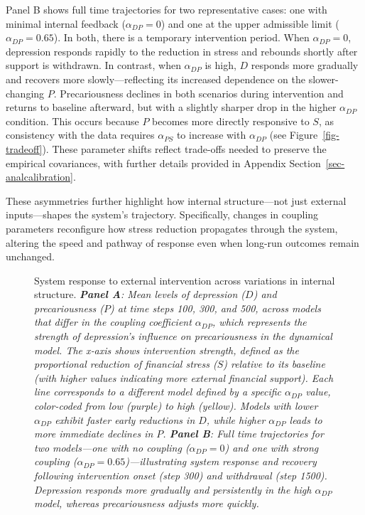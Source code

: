 \documentclass[
]{article}
\begin{document}
Panel B shows full time trajectories for two representative cases: one
with minimal internal feedback (\(\alpha_{DP} = 0\)) and one at the
upper admissible limit (\(\alpha_{DP} = 0.65\)). In both, there is a
temporary intervention period. When \(\alpha_{DP} = 0\), depression
responds rapidly to the reduction in stress and rebounds shortly after
support is withdrawn. In contrast, when \(\alpha_{DP}\) is high, \(D\)
responds more gradually and recovers more slowly---reflecting its
increased dependence on the slower-changing \(P\). Precariousness
declines in both scenarios during intervention and returns to baseline
afterward, but with a slightly sharper drop in the higher
\(\alpha_{DP}\) condition. This occurs because \(P\) becomes more
directly responsive to \(S\), as consistency with the data requires
\(\alpha_{PS}\) to increase with \(\alpha_{DP}\) (see
Figure~\ref{fig-tradeoff}). These parameter shifts reflect trade-offs
needed to preserve the empirical covariances, with further details
provided in Appendix Section~\ref{sec-analcalibration}.

These asymmetries further highlight how internal structure---not just
external inputs---shapes the system's trajectory. Specifically, changes
in coupling parameters reconfigure how stress reduction propagates
through the system, altering the speed and pathway of response even when
long-run outcomes remain unchanged.


\begin{figure}


\caption{\label{fig-intervention}System response to external
intervention across variations in internal structure.
\emph{\textbf{Panel A}: Mean levels of depression (\(D\)) and
precariousness (\(P\)) at time steps 100, 300, and 500, across models
that differ in the coupling coefficient \(\alpha_{DP}\), which
represents the strength of depression's influence on precariousness in
the dynamical model. The x‑axis shows intervention strength, defined as
the proportional reduction of financial stress (\(S\)) relative to its
baseline (with higher values indicating more external financial
support). Each line corresponds to a different model defined by a
specific \(\alpha_{DP}\) value, color-coded from low (purple) to high
(yellow). Models with lower \(\alpha_{DP}\) exhibit faster early
reductions in \(D\), while higher \(\alpha_{DP}\) leads to more
immediate declines in \(P\). \textbf{Panel B}: Full time trajectories
for two models---one with no coupling (\(\alpha_{DP} = 0\)) and one with
strong coupling (\(\alpha_{DP} = 0.65\))---illustrating system response
and recovery following intervention onset (step 300) and withdrawal
(step 1500). Depression responds more gradually and persistently in the
high \(\alpha_{DP}\) model, whereas precariousness adjusts more
quickly.}}

\end{figure}%
\end{document}
